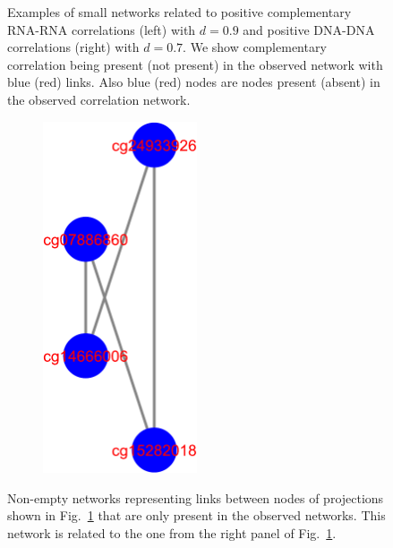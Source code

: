 \documentclass[10pt,a4paper]{article}
\begin{document}
\begin{figure}[h!]
\begin{subfigure}{0.4\textwidth}
\end{subfigure}
\caption{\label{fig:smallnet} Examples of small networks related to positive complementary RNA-RNA correlations (left) with $d=0.9$ and positive DNA-DNA correlations (right) with $d=0.7$.  We show complementary correlation being present (not present) in the observed network with blue (red) links. Also blue (red) nodes are nodes present (absent) in the observed correlation network.}
\end{figure}
\begin{figure}[h!]
\centering
\begin{subfigure}{0.2\textwidth}
\includegraphics[width=0.5\textwidth]{small-DNA-pos-CC-31-notinproj.pdf}
\end{subfigure}
\caption{\label{fig:smallnetnotinproj} Non-empty networks representing links between nodes of projections shown in Fig.~\ref{fig:smallnet} that are only present in the observed networks. This network is related to the one from the right panel of Fig.~\ref{fig:smallnet}.}
\end{figure}
\end{document}
